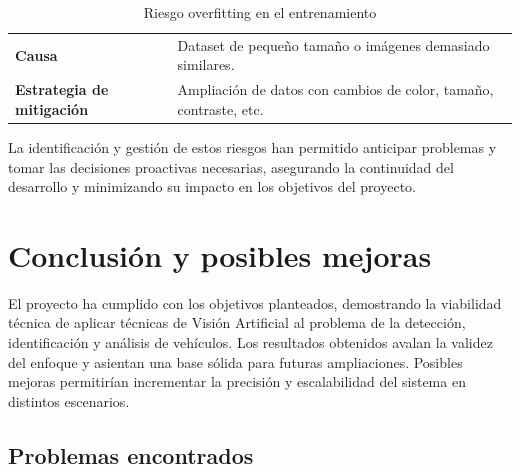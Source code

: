 \documentclass[12pt,a4paper,onecolumn,oneside]{report}
\begin{document}
\begin{table}[ht]
    \centering
    \caption{Riesgo overfitting en el entrenamiento}
    \begin{tabularx}{1\textwidth}{| >{\centering\arraybackslash}X | >{\centering\arraybackslash}X |}
        \hline
        \multicolumn{2}{|c|}{\textbf{R8}}\\
        \hline 
        \textbf{Causa} &  Dataset de pequeño tamaño o imágenes demasiado similares.\\
        \hline 
        \textbf{Estrategia de mitigación} & Ampliación de datos con cambios de color, tamaño, contraste, etc.\\
        \hline
    \end{tabularx}
    \label{R8}
\end{table}

La identificación y gestión de estos riesgos han permitido anticipar problemas y tomar las decisiones proactivas necesarias, asegurando la continuidad del desarrollo y minimizando su impacto en los objetivos del proyecto.



\chapter{Conclusión y posibles mejoras}
\label{Conclusión}

El proyecto ha cumplido con los objetivos planteados, demostrando la viabilidad técnica de aplicar técnicas de Visión Artificial al problema de la detección, identificación y análisis de vehículos. Los resultados obtenidos avalan la validez del enfoque y asientan una base sólida para futuras ampliaciones. Posibles mejoras permitirían incrementar la precisión y escalabilidad del sistema en distintos escenarios.

\section{Problemas encontrados}
\end{document}
